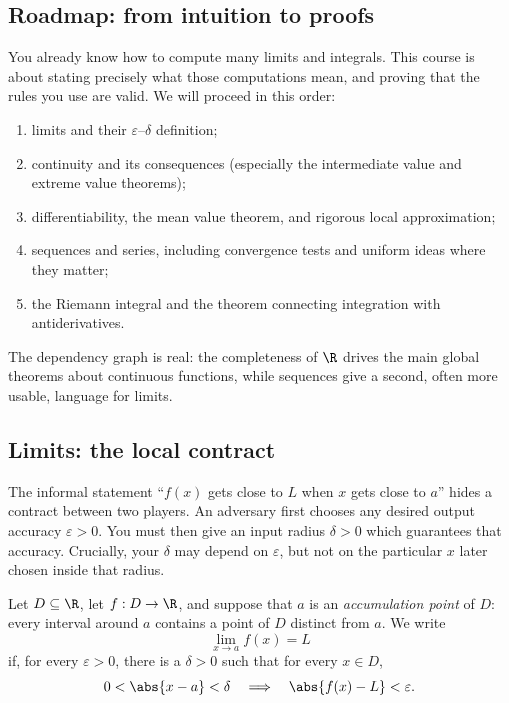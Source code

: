 
\subsection{Roadmap: from intuition to proofs}

You already know how to compute many limits and integrals.  This course is
about stating precisely what those computations mean, and proving that the
rules you use are valid.  We will proceed in this order:
\begin{enumerate}
  \item limits and their $\varepsilon$--$\delta$ definition;
  \item continuity and its consequences (especially the intermediate value
    and extreme value theorems);
  \item differentiability, the mean value theorem, and rigorous local
    approximation;
  \item sequences and series, including convergence tests and uniform ideas
    where they matter;
  \item the Riemann integral and the theorem connecting integration with
    antiderivatives.
\end{enumerate}
The dependency graph is real: the completeness of $\R$ drives the main global
theorems about continuous functions, while sequences give a second, often more
usable, language for limits.

\subsection{Limits: the local contract}

The informal statement ``$f(x)$ gets close to $L$ when $x$ gets close to
$a$'' hides a contract between two players.  An adversary first chooses any
desired output accuracy $\varepsilon>0$.  You must then give an input radius
$\delta>0$ which guarantees that accuracy.  Crucially, your $\delta$ may
depend on $\varepsilon$, but not on the particular $x$ later chosen inside
that radius.

\begin{definition}
Let $D\subseteq\R$, let $f:D\to\R$, and suppose that $a$ is an
\emph{accumulation point} of $D$: every interval around $a$ contains a point
of $D$ distinct from $a$.  We write
\[
  \lim_{x\to a}f(x)=L
\]
if, for every $\varepsilon>0$, there is a $\delta>0$ such that for every
$x\in D$,
\[
  0<\abs{x-a}<\delta \quad\Longrightarrow\quad \abs{f(x)-L}<\varepsilon.
\]
\end{definition}

